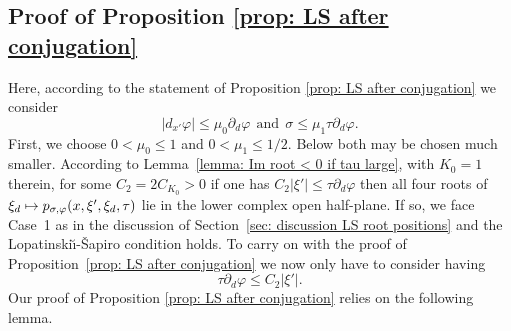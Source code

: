 \documentclass[JEP,XML,SOM,Unicode,published]{cedram}
\newcommand\mto{\mathchoice{\longmapsto}{\mapsto}{\mapsto}{\mapsto}}
\theoremstyle{plain}
\theoremstyle{definition}
\newcommand{\LS}{Lopatinski\u{\i}-\v{S}apiro\xspace}
\newcommand{\pconj}{p_{\sigma,\varphi}}
\begin{document}
\subsection{Proof of Proposition \ref{prop: LS after conjugation}}\label{rf1}

Here, according to the statement of Proposition \ref{prop: LS after
conjugation} we consider\vspace*{-3pt}
\begin{equation*}
|d_{x'}\varphi|\leq \mu_0 \partial_d \varphi
\ \ \text{and} \ \
\sigma \leq \mu_1 \tau \partial_d \varphi.
\end{equation*}
First, we choose $0 < \mu_0 \leq 1$ and $0< \mu_1 \leq 1/2$. Below both may be chosen much
smaller. According to Lemma~\ref{lemma: Im root < 0 if tau large},
with $K_0=1$ therein,
for some $C_2 = 2 C_{K_0}>0$ if one has $C_2|\xi'| \leq \tau \partial_d \varphi$
then all four roots of $\xi_d \mto \pconj(x,\xi',\xi_d
,\tau)$ lie in the lower complex open half-plane. If so,
we face Case~1 as in the discussion of Section~\ref{sec: discussion LS root
positions} and the \LS condition holds.
To carry on with the proof of Proposition~\ref{prop: LS after conjugation} we
now only have to consider having\vspace*{-3pt}
\begin{equation}
\label{eq: condition tau small}
\tau \partial_d \varphi \leq C_2 |\xi'|.
\end{equation}
Our proof of Proposition \ref{prop: LS after conjugation} relies on
the following lemma.
\end{document}
